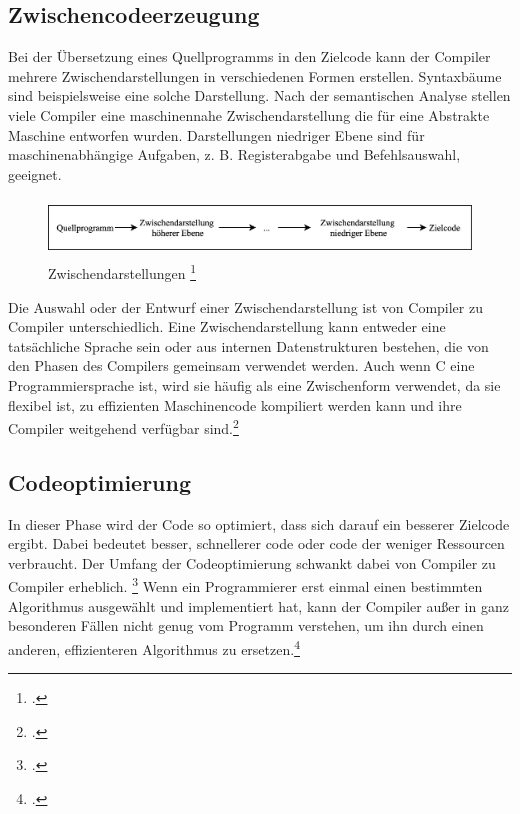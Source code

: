 \subsection{Zwischencodeerzeugung}
Bei der Übersetzung eines Quellprogramms in den Zielcode kann der Compiler mehrere Zwischendarstellungen in verschiedenen Formen erstellen. Syntaxbäume sind beispielsweise eine solche Darstellung. Nach der semantischen Analyse stellen viele Compiler eine maschinennahe Zwischendarstellung die für eine Abstrakte Maschine entworfen wurden.  Darstellungen niedriger Ebene sind für maschinenabhängige Aufgaben, z. B. Registerabgabe und Befehlsauswahl, geeignet.
\begin{figure}[!ht]
 \includegraphics[width=14.5cm,height=1.52cm]{Images/Compiler/Zwischendarstellungen.png}
 \caption[Zwischendarstellungen]{Zwischendarstellungen \protect\footcite{Ullmann2008} }
 \label{fig:Zwischendarstellung}
\end{figure}

Die Auswahl oder der Entwurf einer Zwischendarstellung ist von Compiler zu Compiler  unterschiedlich.  Eine Zwischendarstellung kann entweder eine tatsächliche Sprache  sein oder aus internen Datenstrukturen bestehen, die von den Phasen des Compilers gemeinsam verwendet werden. Auch wenn C eine Programmiersprache ist, wird sie häufig  als eine Zwischenform verwendet, da sie flexibel ist, zu effizienten Maschinencode kompiliert werden kann und ihre Compiler weitgehend verfügbar sind.\footcite[Vgl.][S. 433]{Ullmann2008}


\subsection{Codeoptimierung}
In dieser Phase wird der Code so optimiert, dass sich darauf ein besserer Zielcode ergibt.  Dabei bedeutet besser, schnellerer code oder code der weniger Ressourcen verbraucht.  Der Umfang der Codeoptimierung schwankt dabei von Compiler zu Compiler erheblich.  \footcite[Vgl.][S. 11f]{Ullmann2008} Wenn ein Programmierer erst einmal einen bestimmten Algorithmus ausgewählt  und implementiert hat, kann der Compiler außer in ganz besonderen Fällen nicht genug  vom Programm verstehen, um ihn durch einen anderen, effizienteren Algorithmus zu  ersetzen.\footcite[Vgl.][S. 712]{Ullmann2008}

